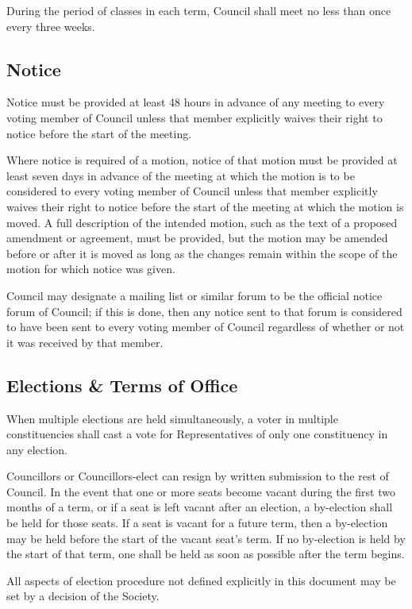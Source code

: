 During the period of classes in each term, Council shall meet no less than once
every three weeks.

\subsection{Notice}
Notice must be provided at least 48 hours in advance of any meeting to every
voting member of Council unless that member explicitly waives their right to
notice before the start of the meeting.

Where notice is required of a motion, notice of that motion must be provided at
least seven days in advance of the meeting at which the motion is to be
considered to every voting member of Council unless that member explicitly
waives their right to notice before the start of the meeting at which the motion
is moved. A full description of the intended motion, such as the text of a
proposed amendment or agreement, must be provided, but the motion may be
amended before or after it is moved as long as the changes remain within the
scope of the motion for which notice was given.

Council may designate a mailing list or similar forum to be the official notice
forum of Council; if this is done, then any notice sent to that forum is
considered to have been sent to every voting member of Council regardless of
whether or not it was received by that member.

\subsection{Elections \& Terms of Office}
When multiple elections are held simultaneously, a voter in multiple
constituencies shall cast a vote for Representatives of only one constituency in
any election.

Councillors or Councillors-elect can resign by written submission to the rest of
Council. In the event that one or more seats become vacant during the first two
months of a term, or if a seat is left vacant after an election, a by-election
shall be held for those seats. If a seat is vacant for a future term, then a
by-election may be held before the start of the vacant seat’s term. If no
by-election is held by the start of that term, one shall be held as soon as
possible after the term begins.

All aspects of election procedure not defined explicitly in this document may be
set by a decision of the Society.

